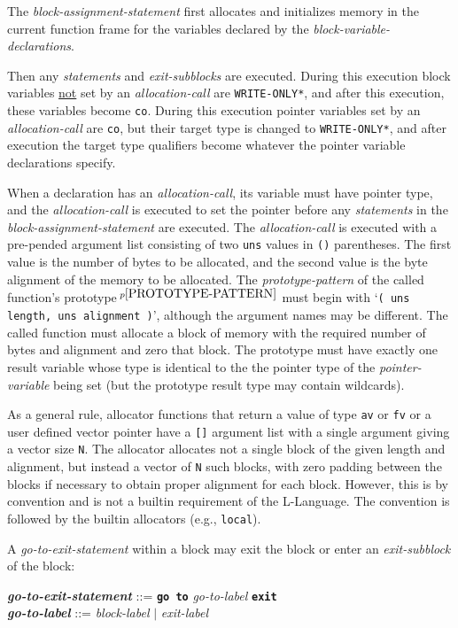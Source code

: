 \documentclass[12pt]{article}
\newcommand{\TT}[1]{{\tt \bfseries #1}}
\newcommand{\ttkey}[1]{{\tt \bfseries #1}}
\newcommand{\emkey}[1]{{\em \bfseries #1}}
\newcommand{\pagnote}[1]{$\,^{p\pageref{#1}}$}
\newcommand{\EOL}{\penalty \exhyphenpenalty}
\newenvironment{indpar}[1][0.3in]%
	{\begin{list}{}%
		     {\setlength{\itemsep}{0in}%
		      \setlength{\topsep}{0in}%
		      \setlength{\parsep}{1ex}%
		      \setlength{\labelwidth}{#1}%
		      \setlength{\leftmargin}{#1}%
		      \addtolength{\leftmargin}{\labelsep}}%
	 \item}%
	{\end{list}}
\begin{document}
The {\em block-assignment-statement}
first allocates and initializes memory in the current function frame
for the variables declared by the {\em block-variable-declarations}.

Then any {\em statements} and
{\em exit-subblocks} are executed.  During this execution
block variables \underline{not} set by an {\em allocation-call}
are {\tt *WRITE-\EOL ONLY*}, and after this execution, these variables become
{\tt co}.  During this execution pointer variables set by
an {\em allocation-call} are {\tt co}, but their target type is changed
to {\tt *WRITE-\EOL ONLY*}, and after execution the target type
qualifiers become whatever the pointer variable declarations specify.

When a declaration has an {\em allocation-call}\label{ALLOCATION-CALL},
its variable must have pointer
type, and the {\em allocation-call} is executed to set the pointer
before any {\em statements} in the {\em block-assignment-statement}
are executed.  The {\em allocation-call} is executed
with a pre-pended argument list consisting of two {\tt uns} values
in {\tt ()} parentheses.  The first value is the number of bytes to
be allocated, and the second value is the byte alignment of the
memory to be allocated.
The {\em prototype-pattern}
of the called function's prototype\pagnote{PROTOTYPE-PATTERN}
must begin with `{\tt ( uns length, uns alignment )}', although
the argument names may be different.
The called function must allocate a block of
memory with the required number of bytes and alignment and zero that
block.  The prototype must have
exactly one result variable whose type is identical to the
the pointer type of the {\em pointer-variable} being set (but the
prototype result type may contain wildcards).

As a general rule, allocator functions that return a value of
type {\tt av} or {\tt fv} or a user defined vector pointer
have a {\tt []} argument list
with a single argument giving a vector size {\tt N}.
The allocator allocates not a single block of the given length
and alignment, but instead a vector of {\tt N} such blocks, with zero padding
between the blocks if necessary to obtain proper alignment for each
block.  However,
this is by convention and is not a builtin requirement of the L-Language.
The convention is followed by the builtin allocators (e.g., {\tt local}).

A {\em go-to-exit-statement} within a block may exit the block or
enter an {\em exit-subblock} of the block:
\begin{indpar}
\emkey{go-to-exit-statement}\label{GO-TO-STATEMENT} ::=
    \ttkey{go to} {\em go-to-label} \TT{exit}
\\[0.5ex]
\emkey{go-to-label} ::= {\em block-label} $|$ {\em exit-label}
\end{indpar}
\end{document}
